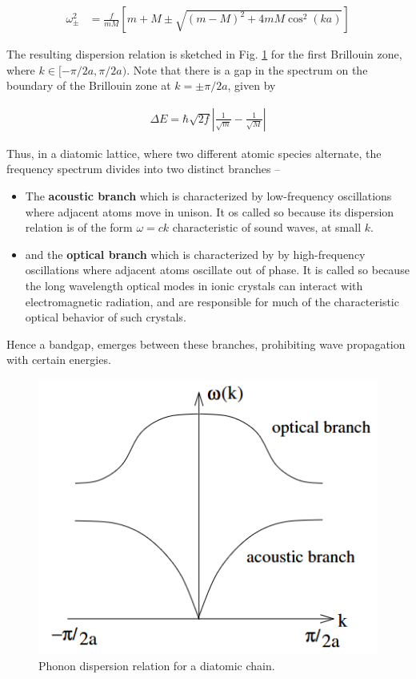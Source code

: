 \begin{align}
    \omega^2_{\pm} &= \frac{f}{mM}\left[m+M\pm \sqrt{(m-M)^2+4mM\cos^2(ka)}\right] 
\end{align}

The resulting dispersion relation is sketched in Fig. \ref{f3} for the first Brillouin zone, where $k \in [-\pi/2a, \pi/2a)$.
Note that there is a gap in the spectrum on the boundary of the Brillouin zone at $k = \pm \pi/2a$, given by

\begin{align}
    \Delta E = \hbar \sqrt{2f} \left|\frac{1}{\sqrt{m}}-\frac{1}{\sqrt{M}}\right|
\end{align}

Thus, in a diatomic lattice, where two different atomic species alternate, the frequency spectrum divides into two distinct branches --

\begin{itemize}
    \item The \textbf{acoustic branch} which is characterized by low-frequency oscillations where adjacent atoms move in unison. It os called so because its dispersion relation is of the form $\omega= ck$ characteristic of sound waves, at small $k$.
    \item and the \textbf{optical branch} which is characterized by by high-frequency oscillations where adjacent atoms oscillate out of phase. It is called so because the long wavelength optical modes in ionic crystals can interact with electromagnetic radiation, and are responsible for much of the characteristic optical behavior of such crystals.\\
\end{itemize}

Hence a bandgap, emerges between these
branches, prohibiting wave propagation with certain energies.

\begin{figure}
    \centering
    \includegraphics[width=.8\columnwidth]{images/th1.png}
    \caption{Phonon dispersion relation for a diatomic chain.}
    \label{f3}
\end{figure}


